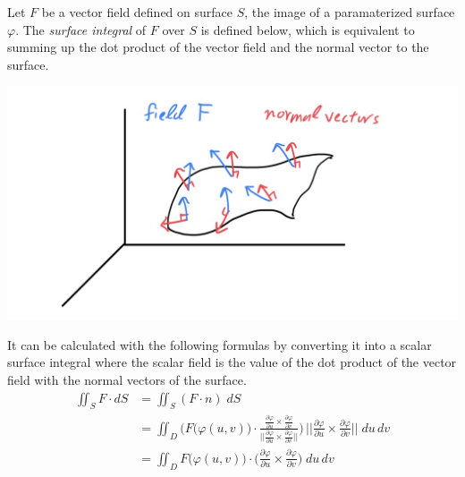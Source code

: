   \begin{definition}
  Let $F$ be a vector field defined on surface $S$, the image of a paramaterized surface $\varphi$. The \textit{surface integral} of $F$ over $S$ is defined below, which is equivalent to summing up the dot product of the vector field and the normal vector to the surface. 
  \begin{center}
      \includegraphics[scale=0.3]{img/Vector_Surface_Integral.jpg}
  \end{center}
  It can be calculated with the following formulas by converting it into a scalar surface integral where the scalar field is the value of the dot product of the vector field with the normal vectors of the surface. 
  \begin{align*}
      \iint_{S} F \cdot d S & = \iint_S (F \cdot n) \; dS \\
      & = \iint_D \Bigg( F\big( \varphi(u, v)\big) \cdot \frac{\frac{\partial \varphi}{\partial u} \times \frac{\partial \varphi}{\partial v}}{\Big|\Big|\frac{\partial \varphi}{\partial u} \times \frac{\partial \varphi}{\partial v} \Big|\Big|} \Bigg) \, \bigg|\bigg|\frac{\partial \varphi}{\partial u} \times \frac{\partial \varphi}{\partial v}\bigg|\bigg|\; du\,dv \\
      & = \iint_D F\big(\varphi(u, v)\big) \cdot \bigg( \frac{\partial \varphi}{\partial u} \times \frac{\partial \varphi}{\partial v}\bigg) \; du\,dv
  \end{align*}
  \end{definition}

